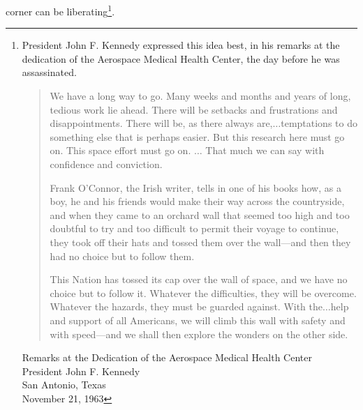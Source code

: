 corner can be liberating\footnote{President John F. Kennedy expressed this idea best, in his remarks at the dedication of the Aerospace Medical Health Center, the day before he was assassinated.
\begin{quotation}
We have a long way to go. Many weeks and months and years of long, tedious work lie ahead. There will be setbacks and frustrations and disappointments. There will be, as there always are,$\ldots$temptations to do something else that is perhaps easier. But this research here must go on. This space effort must go on. $\ldots$ That much we can say with confidence and conviction.

    Frank O'Connor, the Irish writer, tells in one of his books how, as a boy, he and his friends would make their way across the countryside, and when they came to an orchard wall that seemed too high and too doubtful to try and too difficult to permit their voyage to continue, they took off their hats and tossed them over the wall---and then they had no choice but to follow them.

    This Nation has tossed its cap over the wall of space, and we have no choice but to follow it. Whatever the difficulties, they will be overcome. Whatever the hazards, they must be guarded against. With the$\ldots$help and support of all Americans, we will climb this wall with safety and with speed---and we shall then explore the wonders on the other side.
\end{quotation}
Remarks at the Dedication of the Aerospace Medical Health Center\\
President John F. Kennedy\\
San Antonio, Texas\\
November 21, 1963
}.

